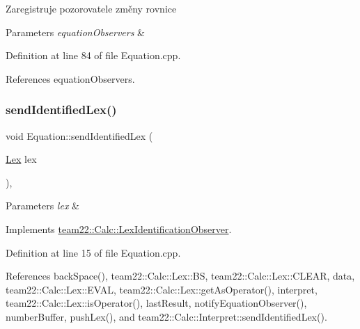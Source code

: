 Zaregistruje pozorovatele změny rovnice 
\begin{DoxyParams}{Parameters}
{\em equation\+Observers} & \\
\hline
\end{DoxyParams}


Definition at line 84 of file Equation.\+cpp.



References equation\+Observers.

\mbox{\label{classteam22_1_1_calc_1_1_equation_ad5768951865500ec7fc514f676de2851}} 
\subsubsection{\texorpdfstring{send\+Identified\+Lex()}{sendIdentifiedLex()}}
{\footnotesize\ttfamily void Equation\+::send\+Identified\+Lex (\begin{DoxyParamCaption}\item[{\hyperlink{classteam22_1_1_calc_1_1_lex}{Lex}}]{lex }\end{DoxyParamCaption})\hspace{0.3cm}{\ttfamily [override]}, {\ttfamily [virtual]}}


\begin{DoxyParams}{Parameters}
{\em lex} & \\
\hline
\end{DoxyParams}


Implements \hyperlink{classteam22_1_1_calc_1_1_lex_identification_observer_ac139f75c560625ec6fdb2e34cf0d4884}{team22\+::\+Calc\+::\+Lex\+Identification\+Observer}.



Definition at line 15 of file Equation.\+cpp.



References back\+Space(), team22\+::\+Calc\+::\+Lex\+::\+BS, team22\+::\+Calc\+::\+Lex\+::\+C\+L\+E\+AR, data, team22\+::\+Calc\+::\+Lex\+::\+E\+V\+AL, team22\+::\+Calc\+::\+Lex\+::get\+As\+Operator(), interpret, team22\+::\+Calc\+::\+Lex\+::is\+Operator(), last\+Result, notify\+Equation\+Observer(), number\+Buffer, push\+Lex(), and team22\+::\+Calc\+::\+Interpret\+::send\+Identified\+Lex().



